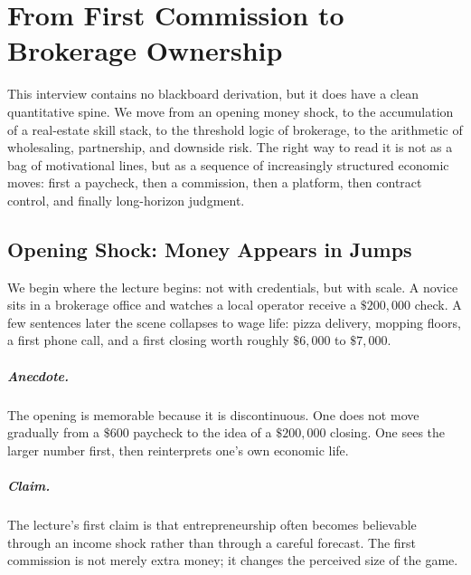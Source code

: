 \chapter{From First Commission to Brokerage Ownership}

This interview contains no blackboard derivation, but it does have a clean quantitative spine. We move from an opening money shock, to the accumulation of a real-estate skill stack, to the threshold logic of brokerage, to the arithmetic of wholesaling, partnership, and downside risk. The right way to read it is not as a bag of motivational lines, but as a sequence of increasingly structured economic moves: first a paycheck, then a commission, then a platform, then contract control, and finally long-horizon judgment.

\section{Opening Shock: Money Appears in Jumps}

We begin where the lecture begins: not with credentials, but with scale. A novice sits in a brokerage office and watches a local operator receive a \(\$200{,}000\) check. A few sentences later the scene collapses to wage life: pizza delivery, mopping floors, a first phone call, and a first closing worth roughly \(\$6{,}000\) to \(\$7{,}000\).

\paragraph{Anecdote.}
The opening is memorable because it is discontinuous. One does not move gradually from a \(\$600\) paycheck to the idea of a \(\$200{,}000\) closing. One sees the larger number first, then reinterprets one's own economic life.

\paragraph{Claim.}
The lecture's first claim is that entrepreneurship often becomes believable through an income shock rather than through a careful forecast. The first commission is not merely extra money; it changes the perceived size of the game.


